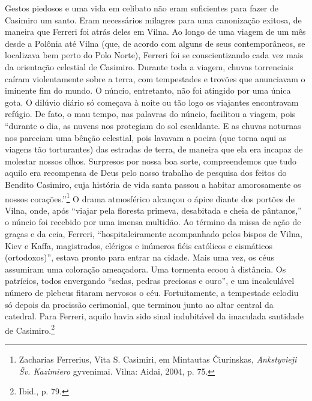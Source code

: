 Gestos piedosos e uma vida em celibato não eram suficientes para fazer
de Casimiro um santo. Eram necessários milagres para uma canonização
exitosa, de maneira que Ferreri foi atrás deles em Vilna. Ao longo de
uma viagem de um mês desde a Polônia até Vilna (que, de acordo com
alguns de seus contemporâneos, se localizava bem perto do Polo Norte),
Ferreri foi se conscientizando cada vez mais da orientação celestial de
Casimiro. Durante toda a viagem, chuvas torrenciais caíram violentamente
sobre a terra, com tempestades e trovões que anunciavam o iminente fim
do mundo. O núncio, entretanto, não foi atingido por uma única gota. O
dilúvio diário só começava à noite ou tão logo os viajantes encontravam
refúgio. De fato, o mau tempo, nas palavras do núncio, facilitou a
viagem, pois ``durante o dia, as nuvens nos protegiam do sol escaldante.
E as chuvas noturnas nos pareciam uma bênção celestial, pois lavavam a
poeira (que torna aqui as viagens tão torturantes) das estradas de
terra, de maneira que ela era incapaz de molestar nossos olhos.
Surpresos por nossa boa sorte, compreendemos que tudo aquilo era
recompensa de Deus pelo nosso trabalho de pesquisa dos feitos do Bendito
Casimiro, cuja história de vida santa passou a habitar amorosamente os
nossos corações.''\footnote{Zacharias Ferrerius, Vita S. Casimiri, em Mintautas Čiurinskas, \textit{Ankstyvieji Šv. Kazimiero} gyvenimai. Vilna: Aidai, 2004, p. 75.}
O drama atmosférico alcançou o ápice diante dos portões de Vilna, onde,
após ``viajar pela floresta primeva, desabitada e cheia de pântanos,'' o
núncio foi recebido por uma imensa multidão. Ao término da missa de ação
de graças e da ceia, Ferreri, ``hospitaleiramente acompanhado pelos
bispos de Vilna, Kiev e Kaffa, magistrados, clérigos e inúmeros fiéis
católicos e cismáticos (ortodoxos)'', estava pronto para entrar na
cidade. Mais uma vez, os céus assumiram uma coloração ameaçadora. Uma
tormenta ecoou à distância. Os patrícios, todos envergando ``sedas,
pedras preciosas e ouro'', e um incalculável número de plebeus fitaram
nervosos o céu. Fortuitamente, a tempestade eclodiu só depois da
procissão cerimonial, que terminou junto ao altar central da catedral.
Para Ferreri, aquilo havia sido sinal indubitável da imaculada santidade
de Casimiro.\footnote{Ibid., p. 79.}

